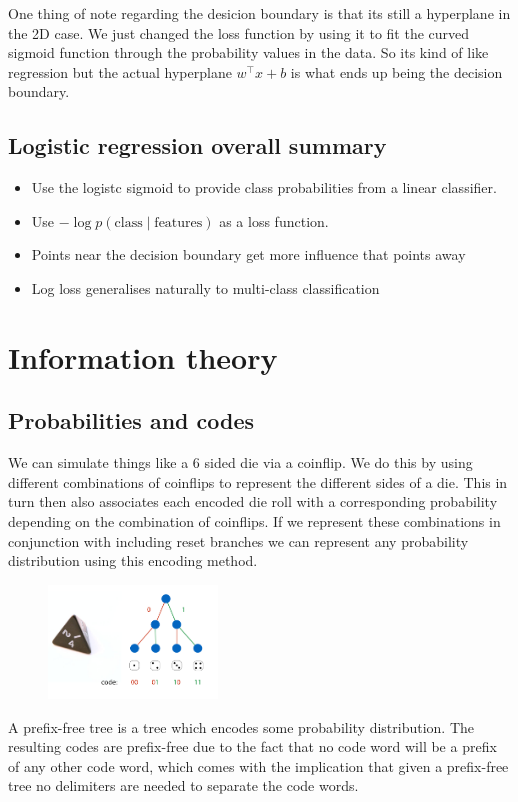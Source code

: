 \documentclass[12pt]{article}
\begin{document}
One thing of note regarding the desicion boundary is that its still a hyperplane in the 2D case. We just changed the loss function by using it to fit the curved sigmoid function through the probability values in the data. So its kind of like regression but the actual hyperplane $w^\intercal x + b$ is what ends up being the decision boundary.

\subsection{Logistic regression overall summary}

\begin{itemize}[leftmargin=*, noitemsep]
    \item Use the logistc sigmoid to provide class probabilities from a linear classifier.
    \item Use $-\log p(\text{class}\mid\text{features})$ as a loss function.
    \item Points near the decision boundary get more influence that points away
    \item Log loss generalises naturally to multi-class classification
\end{itemize}

\section{Information theory}

\subsection{Probabilities and codes}

We can simulate things like a 6 sided die via a coinflip. We do this by using different combinations of coinflips to represent the different sides of a die. This in turn then also associates each encoded die roll with a corresponding probability depending on the combination of coinflips. 
\newpage
If we represent these combinations in conjunction with including reset branches we can represent any probability distribution using this encoding method.
\begin{figure}[!h]
    \centering
    \includegraphics[width=0.4\textwidth]{assets/prefixfreecode.png}
\end{figure}
\begin{definition}
    A prefix-free tree is a tree which encodes some probability distribution. The resulting codes are prefix-free due to the fact that no code word will be a prefix of any other code word, which comes with the implication that given a prefix-free tree no delimiters are needed to separate the code words.
\end{definition}
\end{document}
